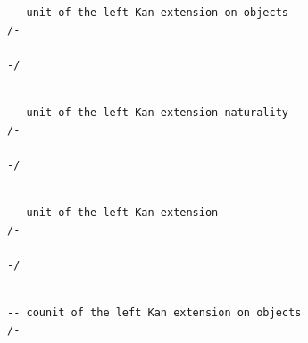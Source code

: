 \documentclass{book}
\theoremstyle{definition}
\newcounter{lcounter}
\begin{document}
{{\begin{center}
\begin{tcolorbox}[width=5in,colback={white},title={\begin{center}\texttt{Lean \thelcounter} \addtocounter{lcounter}{1}  \end{center}},colbacktitle=Blue,coltitle=black]
\begin{verbatim}
-- unit of the left Kan extension on objects
/-

-/

\end{verbatim}
\end{tcolorbox}
\end{center}

\begin{center}
\begin{tcolorbox}[width=5in,colback={white},title={\begin{center}\texttt{Lean \thelcounter} \addtocounter{lcounter}{1}  \end{center}},colbacktitle=Blue,coltitle=black]
\begin{verbatim}

-- unit of the left Kan extension naturality
/-

-/

\end{verbatim}
\end{tcolorbox}
\end{center}

\begin{center}
\begin{tcolorbox}[width=5in,colback={white},title={\begin{center}\texttt{Lean \thelcounter} \addtocounter{lcounter}{1}  \end{center}},colbacktitle=Blue,coltitle=black]
\begin{verbatim}

-- unit of the left Kan extension
/-

-/

\end{verbatim}
\end{tcolorbox}
\end{center}

\begin{center}
\begin{tcolorbox}[width=5in,colback={white},title={\begin{center}\texttt{Lean \thelcounter} \addtocounter{lcounter}{1}  \end{center}},colbacktitle=Blue,coltitle=black]
\begin{verbatim}

-- counit of the left Kan extension on objects
/-


\end{verbatim}
\end{tcolorbox}
\end{center}}}
\end{document}
